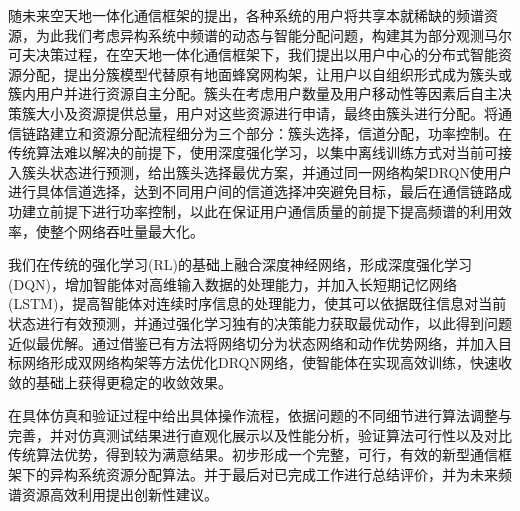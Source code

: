 \begin{cabstract}

随未来空天地一体化通信框架的提出，各种系统的用户将共享本就稀缺的频谱资源，为此我们考虑异构系统中频谱的动态与智能分配问题，构建其为部分观测马尔可夫决策过程，在空天地一体化通信框架下，我们提出以用户中心的分布式智能资源分配，提出分簇模型代替原有地面蜂窝网构架，让用户以自组织形式成为簇头或簇内用户并进行资源自主分配。簇头在考虑用户数量及用户移动性等因素后自主决策簇大小及资源提供总量，用户对这些资源进行申请，最终由簇头进行分配。将通信链路建立和资源分配流程细分为三个部分：簇头选择，信道分配，功率控制。在传统算法难以解决的前提下，使用深度强化学习，以集中离线训练方式对当前可接入簇头状态进行预测，给出簇头选择最优方案，并通过同一网络构架DRQN使用户进行具体信道选择，达到不同用户间的信道选择冲突避免目标，最后在通信链路成功建立前提下进行功率控制，以此在保证用户通信质量的前提下提高频谱的利用效率，使整个网络吞吐量最大化。

我们在传统的强化学习(RL)的基础上融合深度神经网络，形成深度强化学习(DQN)，增加智能体对高维输入数据的处理能力，并加入长短期记忆网络(LSTM)，提高智能体对连续时序信息的处理能力，使其可以依据既往信息对当前状态进行有效预测，并通过强化学习独有的决策能力获取最优动作，以此得到问题近似最优解。通过借鉴已有方法将网络切分为状态网络和动作优势网络，并加入目标网络形成双网络构架等方法优化DRQN网络，使智能体在实现高效训练，快速收敛的基础上获得更稳定的收敛效果。

在具体仿真和验证过程中给出具体操作流程，依据问题的不同细节进行算法调整与完善，并对仿真测试结果进行直观化展示以及性能分析，验证算法可行性以及对比传统算法优势，得到较为满意结果。初步形成一个完整，可行，有效的新型通信框架下的异构系统资源分配算法。并于最后对已完成工作进行总结评价，并为未来频谱资源高效利用提出创新性建议。

\end{cabstract}


